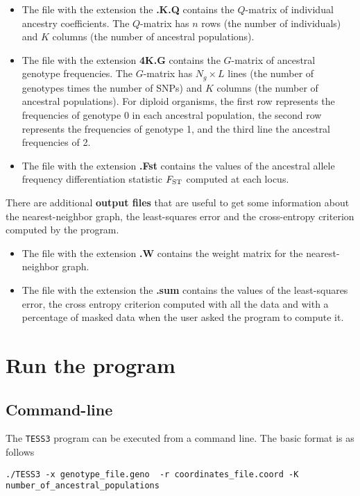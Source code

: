 \documentclass[10pt,a4paper]{article}
\begin{document}
\begin{itemize}
\item The file with the extension the {\bf .K.Q} contains the $Q$-matrix of individual ancestry coefficients.
The $Q$-matrix has $n$ rows (the number of individuals) and $K$ columns (the number of ancestral populations).
\item The file with the extension {\bf 4K.G} contains the $G$-matrix of ancestral genotype frequencies.
The $G$-matrix has $N_g\times L$ lines (the number of genotypes times the number of SNPs) and $K$ columns (the number of ancestral populations). For diploid organisms, the first row represents the frequencies of genotype 0 in each ancestral population, the second row represents the frequencies of genotype 1, and the third line the ancestral frequencies of 2.
\item The file with the extension {\bf .Fst} contains the values of the ancestral allele frequency differentiation statistic $F_{\rm ST}$ computed at each locus.  
\end{itemize}

There are additional {\bf output files} that are useful to get some information about the nearest-neighbor graph, the least-squares error and the cross-entropy criterion computed by the program.

\begin{itemize}
\item The file with the extension {\bf .W} contains the weight matrix for the nearest-neighbor graph.
\item The file with the extension the {\bf .sum} contains the values of the least-squares error, the cross entropy criterion computed with all the data and with a percentage of masked data when the user asked the program to compute it.
\end{itemize}

\section{Run the program}
\subsection{Command-line}
The {\tt TESS3} program can be executed from a command line. The basic format is as follows
\begin{Verbatim}[frame=single]
./TESS3 -x genotype_file.geno  -r coordinates_file.coord -K number_of_ancestral_populations
\end{Verbatim}
\end{document}
